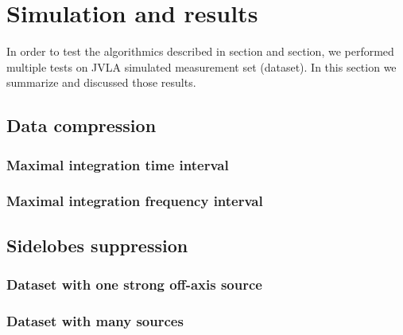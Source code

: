 \documentclass[useAMS,usenatbib]{mn2e}
\begin{document}
\section{Simulation and results}
In order to test the algorithmics described in section and section, we performed  multiple tests on JVLA simulated measurement set 
(dataset). In this section we summarize and discussed those results.
\subsection{Data compression}

\subsubsection{Maximal integration time interval}
\subsubsection{Maximal integration frequency interval}
\subsection{Sidelobes suppression}
\subsubsection{Dataset with one strong off-axis source}
\subsubsection{Dataset with many sources}
\end{document}
